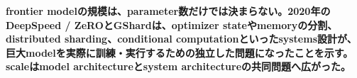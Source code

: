 \noindent\textbf{frontier modelの規模は、parameter数だけでは決まらない。2020年のDeepSpeed / ZeROとGShardは、optimizer stateやmemoryの分割、distributed sharding、conditional computationといったsystems設計が、巨大modelを実際に訓練・実行するための独立した問題になったことを示す。scaleはmodel architectureとsystem architectureの共同問題へ広がった。}\autocite{src-56ccf2fa5ce7,src-f1047e7f654c}

